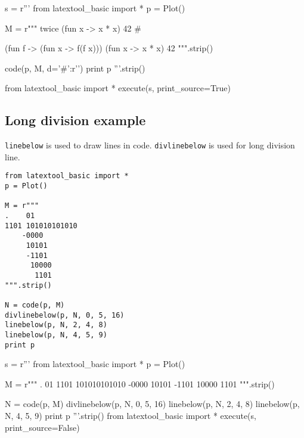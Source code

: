 \begin{python}
s = r'''
from latextool_basic import *
p = Plot()

M = r"""
twice (fun x -> x * x) 42    #


(fun f -> (fun x -> f(f x))) (fun x -> x * x) 42
""".strip()

code(p, M, d={'#':r'\textred{$\rho$}'})
print p
'''.strip()

from latextool_basic import *
execute(s, print_source=True)
\end{python}

\newpage
\subsection{Long division example}

\verb!linebelow! is used to draw lines in code.
\verb!divlinebelow! is used for long division line.

\begin{Verbatim}[frame=single]
from latextool_basic import *
p = Plot()
    
M = r"""
.    01
1101 101010101010
    -0000
     10101
     -1101
      10000
       1101
""".strip()

N = code(p, M)
divlinebelow(p, N, 0, 5, 16)
linebelow(p, N, 2, 4, 8)
linebelow(p, N, 4, 5, 9)
print p
\end{Verbatim}

\begin{python}
s = r'''
from latextool_basic import *
p = Plot()

    
M = r"""
.    01
1101 101010101010
    -0000
     10101
     -1101
      10000
       1101
""".strip()

N = code(p, M)
divlinebelow(p, N, 0, 5, 16)
linebelow(p, N, 2, 4, 8)
linebelow(p, N, 4, 5, 9)
print p
'''.strip()
from latextool_basic import *
execute(s, print_source=False)
\end{python}
